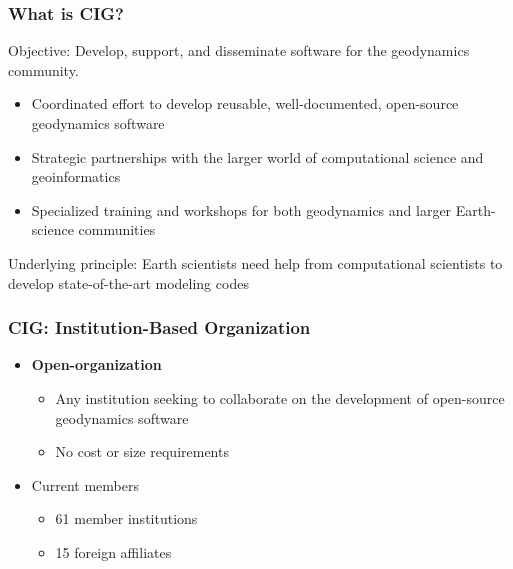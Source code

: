 \documentclass{beamer}
\begin{document}
\begin{frame}
  \frametitle{What is CIG?}
 
  \vfill

  Objective: Develop, support, and disseminate software for the
  geodynamics community.

  \vfill

  \begin{itemize}
  \item Coordinated effort to develop reusable, well-documented,
    open-source geodynamics software
  \item Strategic partnerships with the larger world of
    computational science and geoinformatics
  \item Specialized training and workshops for both geodynamics and
    larger Earth-science communities
  \end{itemize}

  \vfill
 
  Underlying principle: Earth scientists need help from computational
  scientists to develop state-of-the-art modeling codes

\end{frame}


\begin{frame}
  \frametitle{CIG: Institution-Based Organization}
 
  \begin{itemize}
  \item {\bf Open-organization}
    \begin{itemize}
    \item Any institution seeking to collaborate on the development of
      open-source geodynamics software
    \item No cost or size requirements
    \end{itemize}
  \item Current members
    \begin{itemize}
    \item 61 member institutions
    \item 15 foreign affiliates
    \end{itemize}
 \end{itemize}
\end{frame}
\end{document}
